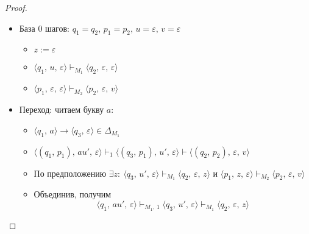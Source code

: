 \documentclass[a4paper,12pt]{article}
\theoremstyle{plain}
\theoremstyle{definition}
\theoremstyle{remark}
\begin{document}
\begin{proof}
\begin{itemize}
		\item База 0 шагов: $q_1 = q_2,\, p_1 = p_2,\, u = \varepsilon,\, v = \varepsilon$
		      \begin{itemize}
			      \item $z := \varepsilon$
			      \item $\langle q_1,\,u,\,\varepsilon\rangle\vdash_{M_1}\langle q_2,\,\varepsilon,\,\varepsilon\rangle$
			      \item $\langle p_1,\,\varepsilon,\,\varepsilon\rangle\vdash_{M_2}\langle p_2,\,\varepsilon,\,v\rangle$
		      \end{itemize}
		\item Переход: читаем букву $a$:
		      \begin{itemize}
			      \item $\langle q_1,\,a\rangle\to\langle q_3,\,\varepsilon\rangle\in\Delta_{M_1}$
			      \item $\langle(q_1,\,p_1),\,au',\,\varepsilon\rangle\vdash_1\langle(q_3,\,p_1),\,u',\,\varepsilon\rangle\vdash\langle(q_2,\,p_2),\,\varepsilon,\,v\rangle$
			      \item По предположению $\exists z :\: \langle q_3,\,u',\,\varepsilon\rangle\vdash_{M_1}\langle q_2,\,\varepsilon,\,z\rangle$ и $\langle p_1,\,z,\,\varepsilon\rangle\vdash_{M_2}\langle p_2,\,\varepsilon,\,v\rangle$
			      \item Объединив, получим
			            \[
				            \langle q_1,\,au',\,\varepsilon\rangle\vdash_{M_1,\,1}\langle q_3,\,u',\,\varepsilon\rangle\vdash_{M_1}\langle q_2,\,\varepsilon,\,z\rangle
			            \]
		      \end{itemize}


\end{itemize}
\end{proof}
\end{document}
